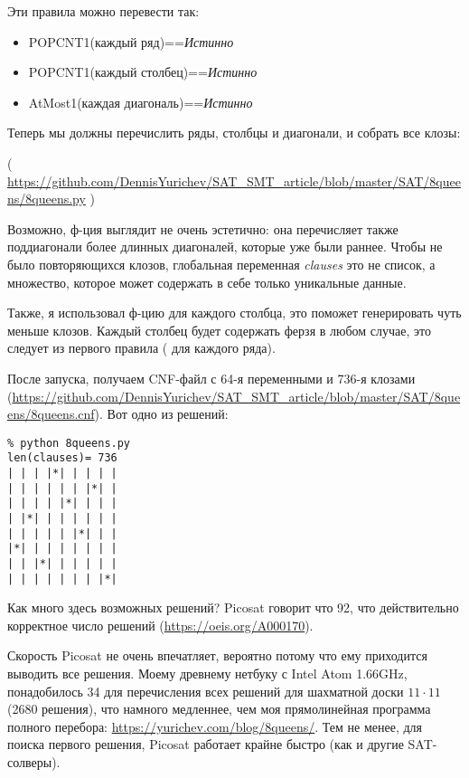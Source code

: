 Эти правила можно перевести так:

\begin{itemize}
\item POPCNT1(каждый ряд)==\textit{Истинно}

\item POPCNT1(каждый столбец)==\textit{Истинно}

\item AtMost1(каждая диагональ)==\textit{Истинно}
\end{itemize}

Теперь мы должны перечислить ряды, столбцы и диагонали, и собрать все клозы:


( \url{https://github.com/DennisYurichev/SAT_SMT_article/blob/master/SAT/8queens/8queens.py} )

Возможно, ф-ция  выглядит не очень эстетично:
она перечисляет также поддиагонали более длинных диагоналей, которые уже были раннее.
Чтобы не было повторяющихся клозов, глобальная переменная \textit{clauses} это не список, а множество,
которое может содержать в себе только уникальные данные.

Также, я использовал ф-цию  для каждого столбца, это поможет генерировать чуть меньше клозов.
Каждый столбец будет содержать ферзя в любом случае, это следует из первого правила ( для каждого ряда).

После запуска, получаем CNF-файл с 64-я переменными и 736-я клозами (\url{https://github.com/DennisYurichev/SAT_SMT_article/blob/master/SAT/8queens/8queens.cnf}).
Вот одно из решений:

\begin{lstlisting}
% python 8queens.py
len(clauses)= 736
| | | |*| | | | |
| | | | | | |*| |
| | | | |*| | | |
| |*| | | | | | |
| | | | | |*| | |
|*| | | | | | | |
| | |*| | | | | |
| | | | | | | |*|
\end{lstlisting}

Как много здесь возможных решений?
Picosat говорит что 92, что действительно корректное число решений (\url{https://oeis.org/A000170}).

Скорость Picosat не очень впечатляет, вероятно потому что ему приходится выводить все решения.
Моему древнему нетбуку с Intel Atom 1.66GHz, понадобилось 34 для перечисления всех решений для шахматной доски
$11 \cdot 11$ 
(2680 решения),
что намного медленнее, чем моя прямолинейная программа полного перебора: \url{https://yurichev.com/blog/8queens/}.
Тем не менее, для поиска первого решения, Picosat работает крайне быстро (как и другие SAT-солверы).

